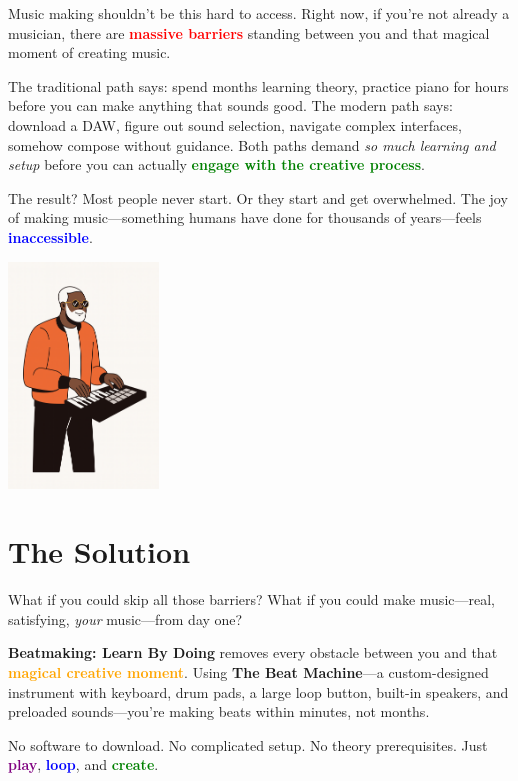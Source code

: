 \documentclass[11pt,letterpaper]{article}
\newcommand{\purple}[1]{\textcolor{purple}{\textbf{#1}}}
\newcommand{\bluepurple}[1]{\textcolor{blue}{\textbf{#1}}}
\newcommand{\greentext}[1]{\textcolor{green}{\textbf{#1}}}
\newcommand{\redtext}[1]{\textcolor{red}{\textbf{#1}}}
\newcommand{\orangetext}[1]{\textcolor{orange}{\textbf{#1}}}
\begin{document}
Music making shouldn't be this hard to access. Right now, if you're not already a musician, there are \redtext{massive barriers} standing between you and that magical moment of creating music.

The traditional path says: spend months learning theory, practice piano for hours before you can make anything that sounds good. The modern path says: download a DAW, figure out sound selection, navigate complex interfaces, somehow compose without guidance. Both paths demand \textit{so much learning and setup} before you can actually \greentext{engage with the creative process}.

The result? Most people never start. Or they start and get overwhelmed. The joy of making music—something humans have done for thousands of years—feels \bluepurple{inaccessible}.

\begin{center}
\includegraphics[width=0.3\textwidth]{../../assets/images/illustrations/Keys.png}
\end{center}

\section*{The Solution}

What if you could skip all those barriers? What if you could make music—real, satisfying, \textit{your} music—from day one?

\textbf{Beatmaking: Learn By Doing} removes every obstacle between you and that \orangetext{magical creative moment}. Using \textbf{The Beat Machine}—a custom-designed instrument with keyboard, drum pads, a large loop button, built-in speakers, and preloaded sounds—you're making beats within minutes, not months.

No software to download. No complicated setup. No theory prerequisites. Just \purple{play}, \bluepurple{loop}, and \greentext{create}.
\end{document}
